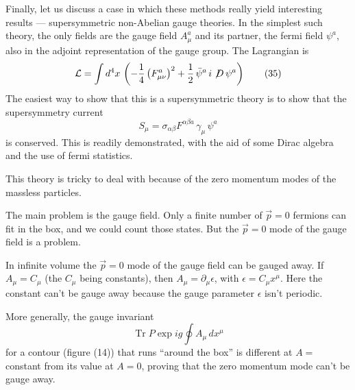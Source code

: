 Finally, let us discuss a case in which these methods really
yield interesting results --- supersymmetric non-Abelian gauge theories.
In the simplest such theory, the only fields are the gauge
field $A_\mu^a$ and its partner, the fermi field $\psi^a$, also in the adjoint
representation of the gauge group. The Lagrangian is
\begin{equation}
\mathcal{L} = \int d^4x\, \left(- \frac{1}{4}\left(F_{\mu\nu}^a\right)^2 + \frac{1}{2}\,\bar\psi^a\, i \not\!D\, \psi^a\right)
\tag{35}
\end{equation}
The easiest way to show that this is a supersymmetric theory is to
show that the supersymmetry current
\begin{equation}
S_\mu = \sigma_{\alpha\beta} F^{\alpha\beta a}\, \gamma_\mu\, \psi^a
\tag{36}
\end{equation}
is conserved. This is readily demonstrated, with the aid of some
Dirac algebra and the use of fermi statistics.

This theory is tricky to deal with because of the zero momentum
modes of the massless particles.

The main problem is the gauge field. Only a finite number of
$\vec p = 0$ fermions can fit in the box, and we could count those states.
But the $\vec p = 0$ mode of the gauge field is a problem.

In infinite volume the $\vec p = 0$ mode of the gauge field can be gauged
away. If $A_\mu = C_\mu$ (the $C_\mu$ being constants), then $A_\mu = \partial_\mu \epsilon$, with
$\epsilon = C_\mu x^\mu$. Here the constant can't be gauge away because the gauge
parameter $\epsilon$ isn't periodic.

More generally, the gauge invariant
\begin{equation}
\operatorname{Tr} P \exp i g \oint A_\mu\, dx^\mu
\tag{37}
\end{equation}
for a contour (figure (14)) that runs ``around the box'' is different
at $A =$ constant from its value at $A = 0$, proving that the zero
momentum mode can't be gauge away.

